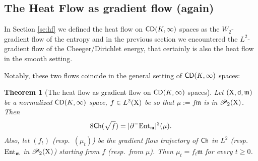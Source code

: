 \documentclass[11pt]{article}
\numberwithin{equation}{section}
\newtheorem{theorem}{Theorem}[section]
\newcommand{\prd}{\mathscr P_2}
\newcommand{\X}{{\rm X}}
\newcommand{\sfd}{{\sf d}}
\newcommand{\mm}{{\mathfrak m}}
\newcommand{\CD}{{\sf CD}}
\newcommand{\ch}{{\sf Ch}}
\newcommand{\ent}{{\rm Ent}_\mm}
\begin{document}
\subsection{The Heat Flow as gradient flow (again)}
In Section \ref{se:hf} we defined the heat flow on $\CD(K,\infty)$ spaces as the $W_2$-gradient flow of the entropy and in the previous section we encountered the $L^2$-gradient flow of the Cheeger/Dirichlet energy, that certainly is also the heat flow in the smooth setting. 

Notably, these two flows coincide in the general setting of $\CD(K,\infty)$ spaces:
\begin{theorem}[The heat flow as gradient flow on $\CD(K,\infty)$ spaces]\label{thm:hfgfagain}
Let $(\X,\sfd,\mm)$ be a normalized $\CD(K,\infty)$ space, $f\in L^2(\X)$ be so that $\mu:=f\mm$ is in $\prd(\X)$. Then
\begin{equation}
\label{eq:slopech}
8\ch(\sqrt{f})=|\partial^-\ent|^2(\mu).
\end{equation}
Also, let $(f_t)$ (resp.\ $(\mu_t)$) be the gradient flow trajectory of $\ch$ in $L^2$ (resp.\ $\ent$ in $\prd(\X)$) starting from $f$ (resp.\ from $\mu$).  Then $\mu_t=f_t\mm$ for every $t\geq 0$.
\end{theorem}
\end{document}
